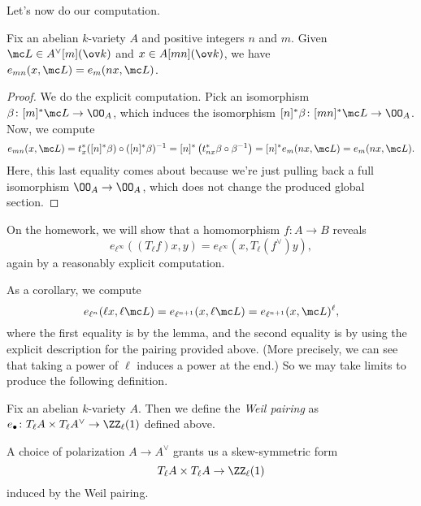\documentclass[../notes.tex]{subfiles}
\begin{document}
Let's now do our computation.
\begin{lemma}
	Fix an abelian $k$-variety $A$ and positive integers $n$ and $m$. Given $\mc L\in A^\lor[m](\ov k)$ and $x\in A[mn](\ov k)$, we have $e_{mn}(x,\mc L)=e_m(nx,\mc L)$.
\end{lemma}
\begin{proof}
	We do the explicit computation. Pick an isomorphism $\beta\colon[m]^*\mc L\to\OO_A$, which induces the isomorphism $[n]^*\beta\colon[mn]^*\mc L\to\OO_A$. Now, we compute
	\[e_{mn}(x,\mc L)=t_x^*([n]^*\beta)\circ([n]^*\beta)^{-1}=[n]^*\left(t_{nx}^*\beta\circ\beta^{-1}\right)=[n]^*e_m(nx,\mc L)=e_m(nx,\mc L).\]
	Here, this last equality comes about because we're just pulling back a full isomorphism $\OO_A\to\OO_A$, which does not change the produced global section.
\end{proof}
\begin{remark}
	On the homework, we will show that a homomorphism $f\colon A\to B$ reveals
	\[e_{\ell^\infty}((T_\ell f)x,y)=e_{\ell^\infty}(x,T_\ell(f^\lor)y),\]
	again by a reasonably explicit computation.
\end{remark}
As a corollary, we compute
\[e_{\ell^{n}}(\ell x,\ell\mc L)=e_{\ell^{n+1}}(x,\ell\mc L)=e_{\ell^{n+1}}(x,\mc L)^{\ell},\]
where the first equality is by the lemma, and the second equality is by using the explicit description for the pairing provided above. (More precisely, we can see that taking a power of $\ell$ induces a power at the end.) So we may take limits to produce the following definition.
\begin{definition}
	Fix an abelian $k$-variety $A$. Then we define the \textit{Weil pairing} as $e_\bullet\colon T_\ell A\times T_\ell A^\lor\to\ZZ_\ell(1)$ defined above.
\end{definition}
\begin{remark}
	A choice of polarization $A\to A^\lor$ grants us a skew-symmetric form
	\[T_\ell A\times T_\ell A\to\ZZ_\ell(1)\]
	induced by the Weil pairing.
\end{remark}
\end{document}
